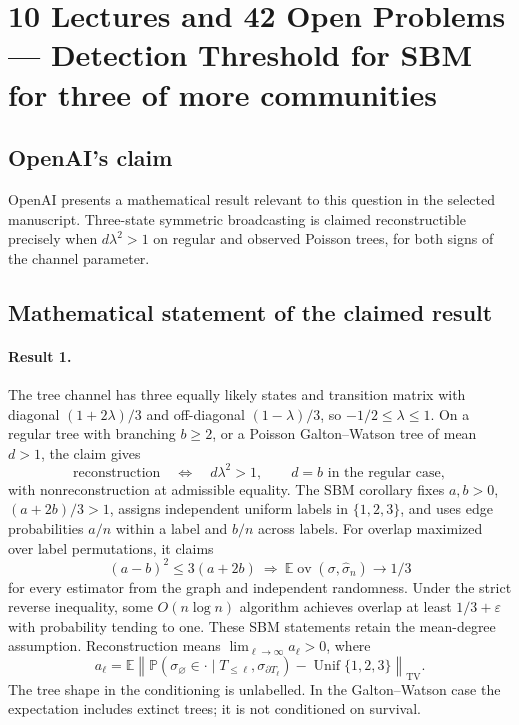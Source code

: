 \documentclass[11pt]{article}
\begin{document}
\section*{10 Lectures and 42 Open Problems — Detection Threshold for SBM for three of more communities}

\subsection{OpenAI's claim}
OpenAI presents a mathematical result relevant to this question in the selected manuscript. Three-state symmetric broadcasting is claimed reconstructible precisely when $d\lambda^2>1$ on regular and observed Poisson trees, for both signs of the channel parameter.

\subsection{Mathematical statement of the claimed result}
\paragraph{Result 1.} The tree channel has three equally likely states and transition matrix with diagonal \((1+2\lambda)/3\) and off-diagonal \((1-\lambda)/3\), so \(-1/2\le\lambda\le1\). On a regular tree with branching \(b\ge2\), or a Poisson Galton--Watson tree of mean \(d>1\), the claim gives
\[
 \text{reconstruction}\quad\Longleftrightarrow\quad d\lambda^2>1,
 \qquad d=b\text{ in the regular case},
\]
with nonreconstruction at admissible equality. The SBM corollary fixes \(a,b>0\), \((a+2b)/3>1\), assigns independent uniform labels in \(\{1,2,3\}\), and uses edge probabilities \(a/n\) within a label and \(b/n\) across labels. For overlap maximized over label permutations, it claims
\[
 (a-b)^2\le3(a+2b)\ \Longrightarrow\
 \mathbb E\operatorname{ov}(\sigma,\widehat\sigma_n)\to1/3
\]
for every estimator from the graph and independent randomness. Under the strict reverse inequality, some \(O(n\log n)\) algorithm achieves overlap at least \(1/3+\varepsilon\) with probability tending to one. These SBM statements retain the mean-degree assumption. Reconstruction means $\lim_{\ell\to\infty}a_\ell>0$, where
\[
 a_\ell=\mathbb E\left\|\mathbb P(\sigma_{\varnothing}\in\cdot\mid T_{\le\ell},\sigma_{\partial T_\ell})-\operatorname{Unif}\{1,2,3\}\right\|_{\mathrm{TV}}.
\]
The tree shape in the conditioning is unlabelled. In the Galton--Watson case the expectation includes extinct trees; it is not conditioned on survival.
\end{document}
